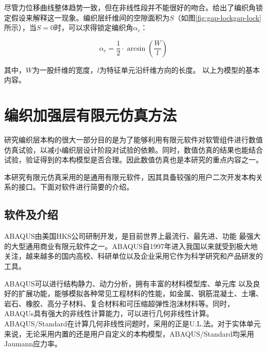 尽管力位移曲线整体趋势一致，但在非线性段并不能很好的吻合。\ha 给出了编织角锁定假设来解释这一现象。编织层纤维间的空隙面积为$ S $（如图\ref{fig:gap-lockgap-lock}所示），当$ S = 0 $时，可以求得锁定编织角$ \alpha_c $：

\begin{equation}
\label{eq:lockalpha}
{\alpha _c} = \frac{1}{2} \cdot \arcsin \left( {\frac{W}{l}} \right)
\end{equation}

其中，$ W $为一股纤维的宽度，$ l  $为特征单元沿纤维方向的长度。
以上为\ha 模型的基本内容。





\section{编织加强层有限元仿真方法}

研究编织层本构的很大一部分目的是为了能够利用有限元软件对软管组件进行数值仿真试验，以减小编织层设计阶段对试验的依赖。同时，数值仿真的结果也能结合试验，验证得到的本构模型是否合理。因此数值仿真也是本研究的重点内容之一。

本研究有限元仿真采用的是通用有限元软件\aba ，因其具备较强的用户二次开发本构关系的接口。下面对\aba 软件进行简要的介绍。


\subsection{\aba 软件及\uma 介绍}
    ABAQUS由美国HKS公司研制开发，是目前世界上最流行、最先进、功能
最强大的大型通用商业有限元软件之一。ABAQUS自1997年进入我国以来就受到极大地关注，越来越多的国内高校、科研单位以及企业采用它作为科学研究和产品研发的工具。


ABAQUS可以进行结构静力、动力分析，拥有丰富的材料模型库、单元库
以及良好的扩展功能，能够模拟各种常见工程材料的性能，如金属、钢筋混凝土、土壤、岩石、橡胶、高分子材料、复合材料和可压缩超弹性泡沫材料等。同时，ABAQUs具有强大的非线性计算能力，可以进行几何非线性计算。ABAQUS/Standard在计算几何非线性问题时，采用的正是U.L.法。对于实体单元来说，无论采用内置的还是用户自定义的本构模型，ABAQUS/Standard均采用Jaumann应力率。


